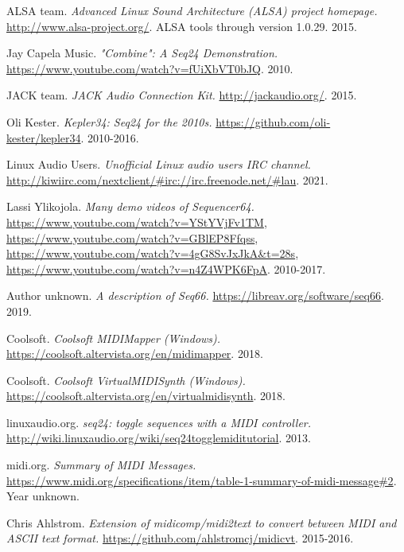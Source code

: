 {\RaggedRight
\begin{thebibliography}{99}

   ALSA team.
   \emph{Advanced Linux Sound Architecture (ALSA) project homepage.}
   \url{http://www.alsa-project.org/}.
   ALSA tools through version 1.0.29.
   2015.

   Jay Capela Music.
   \emph{"Combine": A Seq24 Demonstration.}
   \url{https://www.youtube.com/watch?v=fUiXbVT0bJQ}.
   2010.

   JACK team.
   \emph{JACK Audio Connection Kit.}
   \url{http://jackaudio.org/}.
   2015.

   Oli Kester.
   \emph{Kepler34: Seq24 for the 2010s.}
   \url{https://github.com/oli-kester/kepler34}.
   2010-2016.

   Linux Audio Users.
   \emph{Unofficial Linux audio users IRC channel.}
   \url{http://kiwiirc.com/nextclient/#irc://irc.freenode.net/#lau}.
   2021.

   Lassi Ylikojola.
   \emph{Many demo videos of Sequencer64.}
   \url{https://www.youtube.com/watch?v=YStYVjFv1TM},
   \url{https://www.youtube.com/watch?v=GBlEP8Ffqss},
   \url{https://www.youtube.com/watch?v=4gG8SvJxJkA&t=28s},
   \url{https://www.youtube.com/watch?v=n4Z4WPK6FpA}.
   2010-2017.

   Author unknown.
   \emph{A description of Seq66.}
   \url{https://libreav.org/software/seq66}.
   2019.

   Coolsoft.
   \emph{Coolsoft MIDIMapper (Windows).}
   \url{https://coolsoft.altervista.org/en/midimapper}.
   2018.

   Coolsoft.
   \emph{Coolsoft VirtualMIDISynth (Windows).}
   \url{https://coolsoft.altervista.org/en/virtualmidisynth}.
   2018.

   linuxaudio.org.
   \emph{seq24: toggle sequences with a MIDI controller.}
   \url{http://wiki.linuxaudio.org/wiki/seq24togglemiditutorial}.
   2013.

   midi.org.
   \emph{Summary of MIDI Messages.}
   \url{https://www.midi.org/specifications/item/table-1-summary-of-midi-message#2}.
   Year unknown.

   Chris Ahlstrom.
   \emph{Extension of midicomp/midi2text to convert between MIDI and ASCII
      text format.}
   \url{https://github.com/ahlstromcj/midicvt}.
   2015-2016.


\end{thebibliography}}
